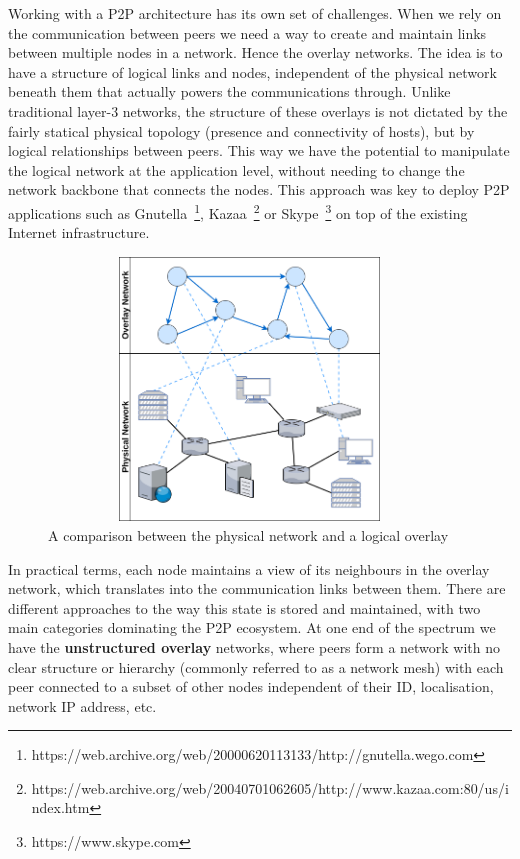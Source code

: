 Working with a P2P architecture has its own set of challenges. When we
rely on the communication between peers we need a way to create and
maintain links between multiple nodes in a network. Hence the overlay
networks. The idea is to have a structure of logical links and nodes,
independent of the physical network beneath them that actually powers
the communications through. Unlike traditional layer-3 networks, the
structure of these overlays is not dictated by the fairly statical
physical topology (presence and connectivity of hosts), but by logical
relationships between peers. This way we have the potential to
manipulate the logical network at the application level, without needing
to change the network backbone that connects the nodes. This approach
was key to deploy P2P applications such as Gnutella~\footnote{https://web.archive.org/web/20000620113133/http://gnutella.wego.com},
Kazaa~\footnote{https://web.archive.org/web/20040701062605/http://www.kazaa.com:80/us/index.htm}
or Skype~\footnote{https://www.skype.com} on top of the existing Internet infrastructure.

\begin{figure}[hb!]
  \centering
  \includegraphics[max height=7cm,max width=0.95\textwidth]{img/overlay-vs-physical.png}
  \caption{A comparison between the physical network and a logical overlay}
  \label{fig:overlay-vs-physical}
\end{figure}

In practical terms, each node maintains a view of its neighbours in the
overlay network, which translates into the communication links between
them. There are different approaches to the way this state is stored and
maintained, with two main categories dominating the P2P ecosystem. At
one end of the spectrum we have the \textbf{unstructured overlay}
networks, where peers form a network with no clear structure or
hierarchy (commonly referred to as a network mesh) with each peer
connected to a subset of other nodes independent of their ID,
localisation, network IP address, etc.
\bigskip

